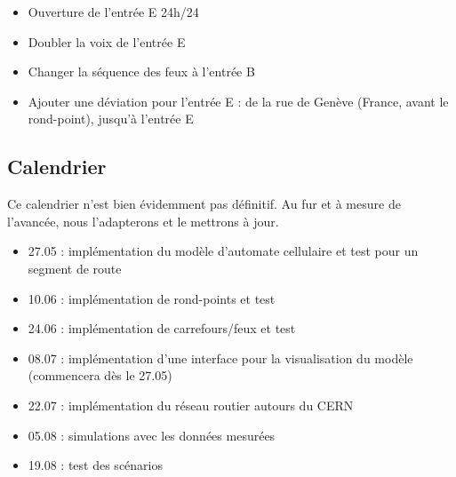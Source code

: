 \documentclass[a4paper,10pt]{extarticle}
\begin{document}
\begin{itemize}
\item Ouverture de l'entrée E 24h/24
\item Doubler la voix de l'entrée E
\item Changer la séquence des feux à l'entrée B
\item Ajouter une déviation pour l'entrée E : de la rue de Genève (France, avant le rond-point), jusqu'à l'entrée E
\end{itemize}

\subsection*{Calendrier}

Ce calendrier n'est bien évidemment pas définitif. Au fur et à mesure de l'avancée, nous l'adapterons et le mettrons à jour.

\begin{itemize}
\item 27.05 : implémentation du modèle d'automate cellulaire et test pour un segment de route
\item 10.06 : implémentation de rond-points et test
\item 24.06 : implémentation de carrefours/feux et test
\item 08.07 : implémentation d'une interface pour la visualisation du modèle (commencera dès le 27.05)
\item 22.07 : implémentation du réseau routier autours du CERN
\item 05.08 : simulations avec les données mesurées
\item 19.08 : test des scénarios
\end{itemize}
\end{document}
